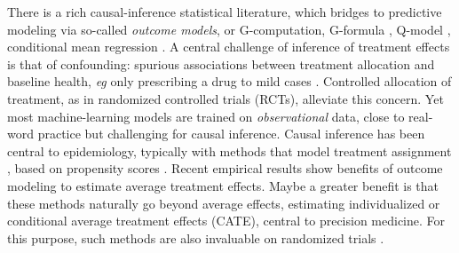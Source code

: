 \documentclass[10pt]{article}
\begin{document}
\begin{multicols}{2}

    There is a rich causal-inference statistical literature, which bridges to
    predictive modeling via so-called \emph{outcome models}, or G-computation,
    G-formula \cite{robins_role_1986}, Q-model \cite{snowden_implementation_2011},
    conditional mean regression \cite{wendling_comparing_2018}. A central challenge
    of inference of treatment effects is that of confounding: spurious associations
    between treatment allocation and baseline health, \emph{eg} only prescribing a
    drug to mild cases \citep{hernan_causal_2020,vanderweele2019principles}.
    Controlled allocation of treatment, as in randomized controlled trials (RCTs),
    alleviate this concern. Yet most machine-learning models are trained on
    \emph{observational} data, close to real-word practice
    \cite{black1996we,hernan_methods_2021} but challenging for causal inference.
    Causal inference has been central to epidemiology, typically with methods that
    model treatment assignment \cite{austin_moving_2015,grose_use_2020}, based on
    propensity scores \cite{rosenbaum_central_1983}. Recent empirical results
    \cite{wendling_comparing_2018,dorie_automated_2019} show benefits of outcome
    modeling to estimate average treatment effects. Maybe a greater benefit is
    that these methods naturally go beyond average effects, estimating
    individualized or conditional average treatment effects (CATE), central to
    precision medicine.
    For this purpose, such methods are also invaluable on randomized trials
    \cite{su2018random,lamont2018identification,hoogland2021tutorial}.


\end{multicols}
\end{document}
